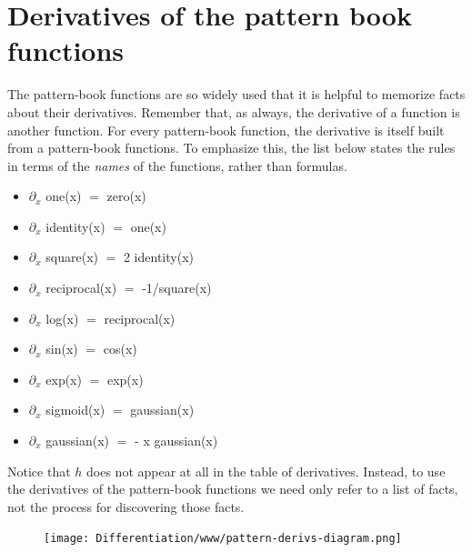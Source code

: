\documentclass[
  letterpaper,
  DIV=11,
  numbers=noendperiod,
  oneside]{scrreprt}
\providecommand{\tightlist}{%
  \setlength{\itemsep}{0pt}\setlength{\parskip}{0pt}}
\begin{document}
\hypertarget{sec-d-pattern-book}{%
\section{Derivatives of the pattern book
functions}\label{sec-d-pattern-book}}

The pattern-book functions are so widely used that it is helpful to
memorize facts about their derivatives. Remember that, as always, the
derivative of a function is another function. For every pattern-book
function, the derivative is itself built from a pattern-book functions.
To emphasize this, the list below states the rules in terms of the
\emph{names} of the functions, rather than formulas.

\begin{itemize}
\tightlist
\item
  \(\partial_x\) one(x) \(=\) zero(x)
\item
  \(\partial_x\) identity(x) \(=\) one(x)
\item
  \(\partial_x\) square(x) \(=\) 2 identity(x)
\item
  \(\partial_x\) reciprocal(x) \(=\) -1/square(x)
\item
  \(\partial_x\) log(x) \(=\) reciprocal(x)
\item
  \(\partial_x\) sin(x) \(=\) cos(x)
\item
  \(\partial_x\) exp(x) \(=\) exp(x)
\item
  \(\partial_x\) sigmoid(x) \(=\) gaussian(x)
\item
  \(\partial_x\) gaussian(x) \(=\) - x gaussian(x)
\end{itemize}


Notice that \(h\) does not appear at all in the table of derivatives.
Instead, to use the derivatives of the pattern-book functions we need
only refer to a list of facts, not the process for discovering those
facts.

\begin{figure}


{\centering \texttt{[image: Differentiation/www/pattern-derivs-diagram.png]}

}

\end{figure}
\end{document}
